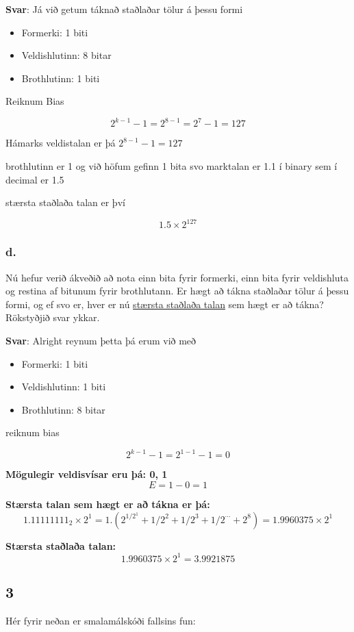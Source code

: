 \documentclass{article}
\begin{document}
\textbf{Svar}:
Já við getum táknað staðlaðar tölur á þessu formi 

\begin{itemize}
    \item Formerki: 1 biti
    \item Veldishlutinn: 8 bitar
    \item Brothlutinn: 1 biti
\end{itemize}


Reiknum Bias

\[2^{k-1} - 1= 2^{8-1} = 2^7 - 1 = 127\]

Hámarks veldistalan er þá $2^{8-1} - 1 = 127$

brothlutinn er 1 og við höfum gefinn 1 bita svo marktalan er 1.1 í binary sem í decimal er 1.5

stærsta staðlaða talan er því

\[1.5 \times 2^{127}\]

\subsubsection{d.} Nú hefur verið ákveðið að nota einn bita fyrir formerki, einn bita fyrir
veldishluta og restina af bitunum fyrir brothlutann. Er hægt að tákna staðlaðar
tölur á þessu formi, og ef svo er, hver er nú \underline{stærsta staðlaða talan} sem hægt er
að tákna? Rökstyðjið svar ykkar.

\textbf{Svar}:
Alright reynum þetta þá erum við með 

\begin{itemize}
    \item Formerki: 1 biti
    \item Veldishlutinn: 1 biti
    \item Brothlutinn: 8 bitar
\end{itemize}

reiknum bias

\[2^{k-1} - 1 = 2^{1-1} - 1 = 0\]

\textbf{Mögulegir veldisvísar eru þá: 0, 1}
\[E = 1 - 0 = 1\]

\textbf{Stærsta talan sem hægt er að tákna er þá:}
\[1.11111111_2 \times 2^1  = 1.(2^{1/2^1}+1/2^2+1/2^3+1/2^{\cdots}+2^8)=1.9960375 \times 2^1\]

\textbf{Stærsta staðlaða talan:}
\[1.9960375 \times 2^1 = 3.9921875\]

\newpage
\subsection{3}
Hér fyrir neðan er smalamálskóði fallsins fun:
\end{document}
